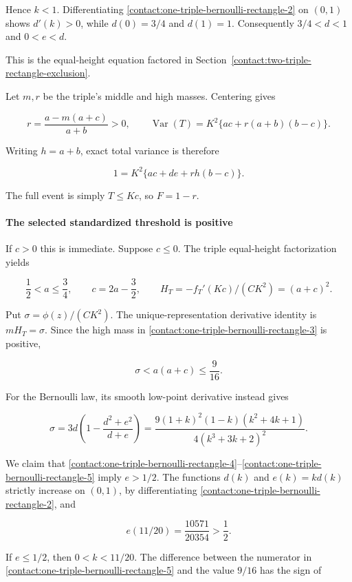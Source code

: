 Hence $k<1$. Differentiating \eqref{contact:one-triple-bernoulli-rectangle-2} on $(0,1)$ shows $d'(k)>0$, while
$d(0)=3/4$ and $d(1)=1$. Consequently $3/4<d<1$ and $0<e<d$.

This is the equal-height equation factored in
Section~\ref{contact:two-triple-rectangle-exclusion}.

Let $m,r$ be the triple's middle and high masses. Centering gives

\[
 r=\frac{a-m(a+c)}{a+b}>0,
 \qquad \operatorname{Var}(T)
   =K^2\{ac+r(a+b)(b-c)\}.
\]

Writing $h=a+b$, exact total variance is therefore

\[
 \boxed{\quad 1=K^2\{ac+de+r h(b-c)\}.\quad}
\tag{B.9.3}\label{contact:one-triple-bernoulli-rectangle-3}
\]

The full event is simply $T\le Kc$, so $F=1-r$.

\paragraph{The selected standardized threshold is positive}

If $c>0$ this is immediate. Suppose $c\le 0$. The triple equal-height
factorization yields

\[
 \frac12<a\leq\frac34,\qquad c=2a-\frac32,
 \qquad H_T=-f_T'(Kc)/(CK^2)=(a+c)^2.
\]

Put $\sigma=\phi(z)/(CK^2)$. The unique-representation derivative identity is
$m H_T=\sigma$. Since the high mass in \eqref{contact:one-triple-bernoulli-rectangle-3} is positive,

\[
 \sigma<a(a+c)\leq\frac9{16}.
\tag{B.9.4}\label{contact:one-triple-bernoulli-rectangle-4}
\]

For the Bernoulli law, its smooth low-point derivative instead gives

\[
 \sigma=3d\left(1-\frac{d^2+e^2}{d+e}\right)
 =\frac{9(1+k)^2(1-k)(k^2+4k+1)}
        {4(k^3+3k+2)^2}.
\tag{B.9.5}\label{contact:one-triple-bernoulli-rectangle-5}
\]

We claim that \eqref{contact:one-triple-bernoulli-rectangle-4}--\eqref{contact:one-triple-bernoulli-rectangle-5} imply $e>1/2$. The functions $d(k)$ and
$e(k)=kd(k)$ strictly increase on $(0,1)$, by differentiating \eqref{contact:one-triple-bernoulli-rectangle-2}, and

\[
 e(11/20)=\frac{10571}{20354}>\frac12.
\]

If $e\le 1/2$, then $0<k<11/20$. The difference between the numerator
in \eqref{contact:one-triple-bernoulli-rectangle-5} and the value $9/16$ has the sign of

